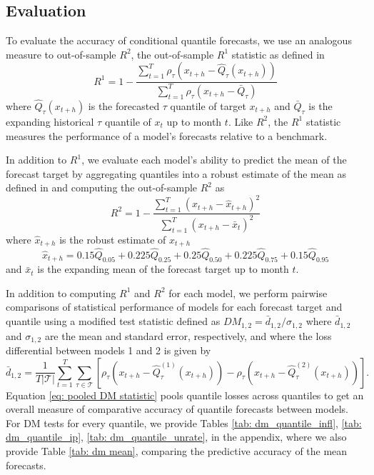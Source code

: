 \documentclass[12pt]{article}
\begin{document}
\subsection{Evaluation}\label{sec:evaluation}

To evaluate the accuracy of conditional quantile forecasts, we use an analogous measure to out-of-sample $R^2$, the out-of-sample $R^1$ statistic as defined in \cite{koenkerGoodnessFitRelated1999}
\begin{equation}
	R^1 = 1 - \frac{\sum_{t=1}^T \rho_\tau(x_{t+h} - \hat Q_{\tau}(x_{t+h}))}{\sum_{t=1}^T \rho_\tau(x_{t+h} - \bar Q_{\tau})}
\end{equation}
where $\hat Q_{\tau}(x_{t+h})$ is the forecasted $\tau$ quantile of target $x_{t+h}$ and $\bar Q_\tau$ is the expanding historical $\tau$ quantile of $x_t$ up to month $t$. Like $R^2$, the $R^1$ statistic measures the performance of a model's forecasts relative to a benchmark.    

In addition to $R^1$, we evaluate each model's ability to predict the mean of the forecast target by aggregating quantiles into a robust estimate of the mean as defined in \cite{liuStockDistributionRisk2023} and computing the out-of-sample $R^2$ as
\begin{equation}
	R^2 = 1 - \frac{\sum_{t=1}^T (x_{t+h} - \hat x_{t+h})^2}{\sum_{t=1}^T (x_{t+h} - \bar x_t)^2}
\end{equation}
where $\hat x_{t+h}$ is the robust estimate of $x_{t+h}$
\begin{equation}
	\hat x_{t+h} = 0.15\hat Q_{0.05} + 0.225 \hat Q_{0.25} + 0.25 \hat Q_{0.50} + 0.225 \hat Q_{0.75} + 0.15 \hat Q_{0.95}
\end{equation}
and $\bar x_t$ is the expanding mean of the forecast target up to month $t$. 

In addition to computing $R^1$ and $R^2$ for each model, we perform pairwise comparisons of statistical performance of models for each forecast target and quantile using a modified \cite{dieboldComparingPredictiveAccuracy2002} test statistic defined as 
$DM_{1,2} = \bar d_{1,2} / \sigma_{1, 2}$ where $\bar d_{1,2}$ and $\sigma_{1, 2}$ are the mean and \cite{neweyAutomaticLagSelection1994} standard error, respectively, and where the loss differential between models 1 and 2 is given by
\begin{equation}\label{eq: pooled DM statistic}
	\bar d_{1,2} = \frac{1}{T|\mathcal T|}\sum_{t=1}^T \sum_{\tau \in \mathcal T} [\rho_\tau (x_{t+h} - \hat Q^{(1)}_\tau (x_{t+h})) - \rho_\tau(x_{t+h} - \hat Q^{(2)}_\tau (x_{t+h}))].
\end{equation}
Equation \ref{eq: pooled DM statistic} pools quantile losses across quantiles to get an overall measure of comparative accuracy of quantile forecasts between models. For DM tests for every quantile, we provide Tables \ref{tab: dm_quantile_infl}, \ref{tab: dm_quantile_ip}, \ref{tab: dm_quantile_unrate}, in the appendix, where we also provide Table \ref{tab: dm mean}, comparing the predictive accuracy of the mean forecasts.
\end{document}
